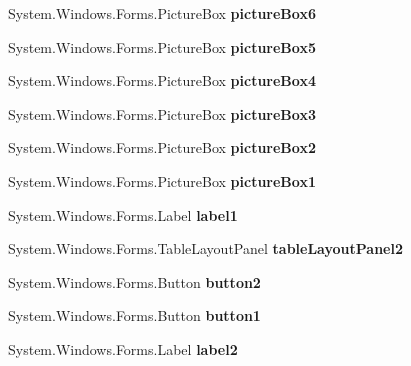 \begin{DoxyCompactItemize}
System.\+Windows.\+Forms.\+Picture\+Box {\bfseries picture\+Box6}
\item 
\mbox{\label{class_reversi_form_1_1_reversi_a49fe5a07a4ec278ffd1afa4907fee256}} 
System.\+Windows.\+Forms.\+Picture\+Box {\bfseries picture\+Box5}
\item 
\mbox{\label{class_reversi_form_1_1_reversi_a548dc51670b1e16907c9a97484778c28}} 
System.\+Windows.\+Forms.\+Picture\+Box {\bfseries picture\+Box4}
\item 
\mbox{\label{class_reversi_form_1_1_reversi_ac2558d1189c9afe64b967b1595fa79ad}} 
System.\+Windows.\+Forms.\+Picture\+Box {\bfseries picture\+Box3}
\item 
\mbox{\label{class_reversi_form_1_1_reversi_ae4b3742d14a3e079e9fa25d038965810}} 
System.\+Windows.\+Forms.\+Picture\+Box {\bfseries picture\+Box2}
\item 
\mbox{\label{class_reversi_form_1_1_reversi_a8effd3cbb4f024401db4ce7ada1210bd}} 
System.\+Windows.\+Forms.\+Picture\+Box {\bfseries picture\+Box1}
\item 
\mbox{\label{class_reversi_form_1_1_reversi_a4b57eccbd52039bb8edb0a99c60aa411}} 
System.\+Windows.\+Forms.\+Label {\bfseries label1}
\item 
\mbox{\label{class_reversi_form_1_1_reversi_ae080c103020a6c5b630712faa963e10a}} 
System.\+Windows.\+Forms.\+Table\+Layout\+Panel {\bfseries table\+Layout\+Panel2}
\item 
\mbox{\label{class_reversi_form_1_1_reversi_ac6e6cfc960caa4b9333b2915bd809a64}} 
System.\+Windows.\+Forms.\+Button {\bfseries button2}
\item 
\mbox{\label{class_reversi_form_1_1_reversi_a40b173fb63f3b07a39f94612e1d80382}} 
System.\+Windows.\+Forms.\+Button {\bfseries button1}
\item 
\mbox{\label{class_reversi_form_1_1_reversi_af13abe1d3f2b346aeb1343db16391a6b}} 
System.\+Windows.\+Forms.\+Label {\bfseries label2}
\end{DoxyCompactItemize}
